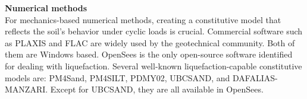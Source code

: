 \noindent\textbf{Numerical methods}\\
For mechanics-based numerical methods, creating a constitutive model that reflects the soil’s behavior under cyclic loads is crucial. Commercial software such as PLAXIS and FLAC are widely used by the geotechnical community. Both of them are Windows based. OpenSees is the only open-source software identified for dealing with liquefaction. Several well-known liquefaction-capable constitutive models are: PM4Sand, PM4SILT, PDMY02, UBCSAND, and DAFALIAS-MANZARI. Except for UBCSAND, they are all available in OpenSees.

%
